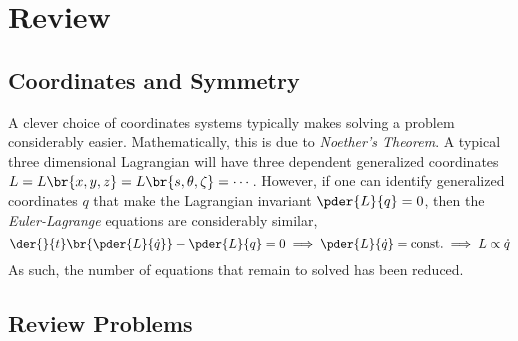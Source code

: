 \documentclass{article}
\begin{document}
\titlePage

\tableOfContents

\disclaimer

\section{Review}

\subsection{Coordinates and Symmetry}

A clever choice of coordinates systems typically makes solving a problem considerably easier. Mathematically, this is due to \textit{Noether's Theorem}. A typical three dimensional Lagrangian will have three dependent generalized coordinates $L = L \br{x,y,z} = L \br{s,\theta,\zeta} = \cdots$. However, if one can identify generalized coordinates $q$ that make the Lagrangian invariant $\pder{L}{q} = 0$, then the \textit{Euler-Lagrange} equations are considerably similar,
\[ \der{}{t}\br{\pder{L}{\dot{q}}} - \pder{L}{q} = 0 \implies \pder{L}{\dot{q}} = \textrm{const.} \implies L \propto \dot{q} \]
As such, the number of equations that remain to solved has been reduced.

\subsection{Review Problems}
\end{document}
